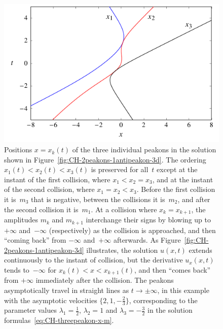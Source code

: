 \documentclass[10pt,a4paper]{article} \pdfoutput=1 
\begin{document}
\begin{figure}
  \centering
  \includegraphics[width=1.0\linewidth]{graphics/CH-2peakons-1antipeakon.pdf}
  \caption{Positions $x = x_k(t)$ of the three individual peakons in the solution shown in
    Figure~\ref{fig:CH-2peakons-1antipeakon-3d}.
    The ordering $x_1(t) < x_2(t) < x_3(t)$ is preserved for all~$t$
    except at the instant of the first collision, where $x_1 < x_2 = x_3$,
    and at the instant of the second collision, where $x_1 = x_2 < x_3$.
    Before the first collision it is~$m_3$ that is negative,
    between the collisions it is~$m_2$,
    and after the second collision it is~$m_1$.
    At a collision where $x_k = x_{k+1}$,
    the amplitudes $m_k$ and $m_{k+1}$ interchange their signs
    by blowing up to $+\infty$ and~$-\infty$ (respectively) as the collision is approached,
    and then ``coming back'' from $-\infty$ and~$+\infty$ afterwards.
    As Figure~\ref{fig:CH-2peakons-1antipeakon-3d} illustrates,
    the solution $u(x,t)$ extends continuously to the instant of collision,
    but the derivative $u_{x}(x,t)$ tends to~$-\infty$ for $x_k(t) < x < x_{k+1}(t)$,
    and then ``comes back'' from $+\infty$ immediately after the collision.
    The peakons asymptotically travel in straight lines as $t \to \pm\infty$,
    in this example with the asymptotic velocities $\{ 2, 1, -\tfrac23 \}$,
    corresponding to the parameter values $\lambda_1 = \tfrac12$,
    $\lambda_2 = 1$ and $\lambda_3 = -\tfrac32$ in the
    solution formulas~\eqref{eq:CH-threepeakon-x-m}.
  }
  \label{fig:CH-2peakons-1antipeakon-positions}
\end{figure}
\end{document}
